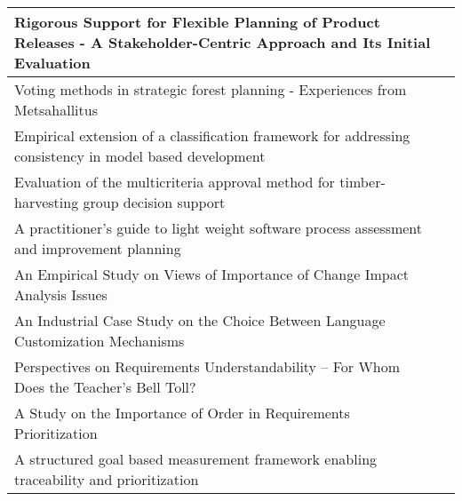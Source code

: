 \begin{center}
{\begin{tabular}{
|>{\raggedright}p{}
|>{\raggedright}p{}
|}
Rigorous Support for Flexible Planning of Product Releases - A Stakeholder-Centric Approach and Its Initial Evaluation & \citet{Heikkila2010}\tabularnewline \hline
Voting methods in strategic forest planning - Experiences from Metsahallitus & \citet{Hiltunen2008}\tabularnewline \hline
Empirical extension of a classification framework for addressing consistency in model based development & \citet{Kuzniarz2010}\tabularnewline \hline
Evaluation of the multicriteria approval method for timber-harvesting group decision support & \citet{Laukkanen2005a} \tabularnewline \hline
A practitioner's guide to light weight software process assessment and improvement planning & \citet{Pettersson2008} \tabularnewline \hline
An Empirical Study on Views of Importance of Change Impact Analysis Issues & \citet{Rovegard2008} \tabularnewline \hline
An Industrial Case Study on the Choice Between Language Customization Mechanisms & \citet{Staron2006} \tabularnewline \hline
Perspectives on Requirements Understandability -- For Whom Does the Teacher's Bell Toll? & \citet{Svahnberg2008} \tabularnewline \hline
A Study on the Importance of Order in Requirements Prioritization & \citet{Svahnberg2009} \tabularnewline \hline
A structured goal based measurement framework enabling traceability and prioritization & \citet{Touseef2010} \tabularnewline \hline

\end{tabular}
} %
\end{center}
